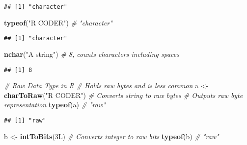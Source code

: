 \documentclass[
]{article}
\newenvironment{Shaded}{\begin{snugshade}}{\end{snugshade}}
\newcommand{\CommentTok}[1]{\textcolor[rgb]{0.56,0.35,0.01}{\textit{#1}}}
\newcommand{\DataTypeTok}[1]{\textcolor[rgb]{0.13,0.29,0.53}{#1}}
\newcommand{\DecValTok}[1]{\textcolor[rgb]{0.00,0.00,0.81}{#1}}
\newcommand{\FunctionTok}[1]{\textcolor[rgb]{0.13,0.29,0.53}{\textbf{#1}}}
\newcommand{\NormalTok}[1]{#1}
\newcommand{\OtherTok}[1]{\textcolor[rgb]{0.56,0.35,0.01}{#1}}
\newcommand{\StringTok}[1]{\textcolor[rgb]{0.31,0.60,0.02}{#1}}
\begin{document}
\begin{verbatim}
## [1] "character"
\end{verbatim}

\begin{Shaded}
\begin{Highlighting}[]
\FunctionTok{typeof}\NormalTok{(}\StringTok{"R CODER"}\NormalTok{)     }\CommentTok{\# "character"}
\end{Highlighting}
\end{Shaded}

\begin{verbatim}
## [1] "character"
\end{verbatim}

\begin{Shaded}
\begin{Highlighting}[]
\FunctionTok{nchar}\NormalTok{(}\StringTok{"A string"}\NormalTok{)     }\CommentTok{\# 8, counts characters including spaces}
\end{Highlighting}
\end{Shaded}

\begin{verbatim}
## [1] 8
\end{verbatim}

\begin{Shaded}
\begin{Highlighting}[]
\CommentTok{\# Raw Data Type in R}
\CommentTok{\# Holds raw bytes and is less common}
\NormalTok{a }\OtherTok{\textless{}{-}} \FunctionTok{charToRaw}\NormalTok{(}\StringTok{"R CODER"}\NormalTok{)  }\CommentTok{\# Converts string to raw bytes                         \# Outputs raw byte representation}
\FunctionTok{typeof}\NormalTok{(a)                 }\CommentTok{\# "raw"}
\end{Highlighting}
\end{Shaded}

\begin{verbatim}
## [1] "raw"
\end{verbatim}

\begin{Shaded}
\begin{Highlighting}[]
\NormalTok{b }\OtherTok{\textless{}{-}} \FunctionTok{intToBits}\NormalTok{(}\DecValTok{3}\DataTypeTok{L}\NormalTok{)        }\CommentTok{\# Converts integer to raw bits}
\FunctionTok{typeof}\NormalTok{(b)                 }\CommentTok{\# "raw"}
\end{Highlighting}
\end{Shaded}
\end{document}
